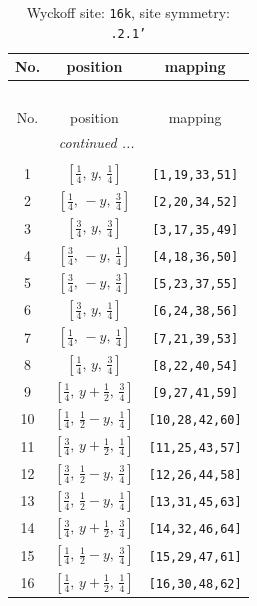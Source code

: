 \documentclass[fleqn,8pt]{jsarticle}
\begin{document}
\renewcommand{\arraystretch}{1.2}
\begin{longtable}{ccc}
\caption{Wyckoff site: {\tt 16k}, site symmetry: {\tt .2.1'}}
 \\
 \hline \hline
No. & position & mapping \\ \hline \endfirsthead

\multicolumn{2}{l}{\tablename\ \thetable{}} \\
 \hline \hline
No. & position & mapping \\ \hline \endhead

 \hline \hline
\multicolumn{2}{r}{\footnotesize\it continued ...} \\ \endfoot

 \hline \hline
\multicolumn{2}{r}{} \\ \endlastfoot

1 & $\left[ \frac{1}{4},\, y,\, \frac{1}{4} \right]$ & {\tt [1,19,33,51]} \\ \hline
2 & $\left[ \frac{1}{4},\, - y,\, \frac{3}{4} \right]$ & {\tt [2,20,34,52]} \\ \hline
3 & $\left[ \frac{3}{4},\, y,\, \frac{3}{4} \right]$ & {\tt [3,17,35,49]} \\ \hline
4 & $\left[ \frac{3}{4},\, - y,\, \frac{1}{4} \right]$ & {\tt [4,18,36,50]} \\ \hline
5 & $\left[ \frac{3}{4},\, - y,\, \frac{3}{4} \right]$ & {\tt [5,23,37,55]} \\ \hline
6 & $\left[ \frac{3}{4},\, y,\, \frac{1}{4} \right]$ & {\tt [6,24,38,56]} \\ \hline
7 & $\left[ \frac{1}{4},\, - y,\, \frac{1}{4} \right]$ & {\tt [7,21,39,53]} \\ \hline
8 & $\left[ \frac{1}{4},\, y,\, \frac{3}{4} \right]$ & {\tt [8,22,40,54]} \\ \hline
9 & $\left[ \frac{1}{4},\, y + \frac{1}{2},\, \frac{3}{4} \right]$ & {\tt [9,27,41,59]} \\ \hline
10 & $\left[ \frac{1}{4},\, \frac{1}{2} - y,\, \frac{1}{4} \right]$ & {\tt [10,28,42,60]} \\ \hline
11 & $\left[ \frac{3}{4},\, y + \frac{1}{2},\, \frac{1}{4} \right]$ & {\tt [11,25,43,57]} \\ \hline
12 & $\left[ \frac{3}{4},\, \frac{1}{2} - y,\, \frac{3}{4} \right]$ & {\tt [12,26,44,58]} \\ \hline
13 & $\left[ \frac{3}{4},\, \frac{1}{2} - y,\, \frac{1}{4} \right]$ & {\tt [13,31,45,63]} \\ \hline
14 & $\left[ \frac{3}{4},\, y + \frac{1}{2},\, \frac{3}{4} \right]$ & {\tt [14,32,46,64]} \\ \hline
15 & $\left[ \frac{1}{4},\, \frac{1}{2} - y,\, \frac{3}{4} \right]$ & {\tt [15,29,47,61]} \\ \hline
16 & $\left[ \frac{1}{4},\, y + \frac{1}{2},\, \frac{1}{4} \right]$ & {\tt [16,30,48,62]} \\
\end{longtable}
\end{document}
